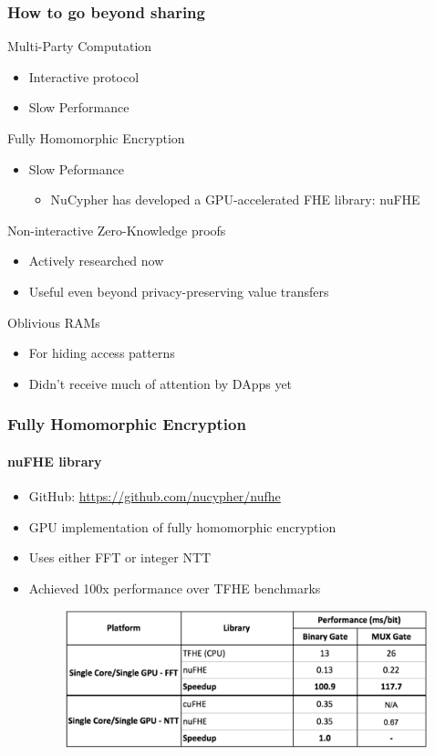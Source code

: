 \documentclass[xetex,mathsans,sans,aspectratio=169]{beamer}
\begin{document}
    \begin{frame}
        \frametitle{How to go beyond sharing}
        Multi-Party Computation
        \begin{itemize}
           \item Interactive protocol
           \item Slow Performance
        \end{itemize}

        Fully Homomorphic Encryption
        \begin{itemize}
           \item Slow Peformance
           \begin{itemize}
               \item NuCypher has developed a GPU-accelerated FHE library: nuFHE
           \end{itemize}
        \end{itemize}

        Non-interactive Zero-Knowledge proofs
        \begin{itemize}
            \item Actively researched now
            \item Useful even beyond privacy-preserving value transfers
        \end{itemize}

        Oblivious RAMs
        \begin{itemize}
            \item For hiding access patterns
            \item Didn't receive much of attention by DApps yet
        \end{itemize}
    \end{frame}

    \begin{frame}
      \frametitle{Fully Homomorphic Encryption}
       \framesubtitle{nuFHE library}
       \begin{itemize}
           \item GitHub: \url{https://github.com/nucypher/nufhe}
           \item GPU implementation of fully homomorphic encryption
           \item Uses either FFT or integer NTT
           \item Achieved 100x performance over TFHE benchmarks
           \begin{figure}
               \includegraphics[width=10.5cm]{pdf/nufhe-benchmarks.pdf}
           \end{figure}
       \end{itemize}
     \end{frame}
\end{document}
